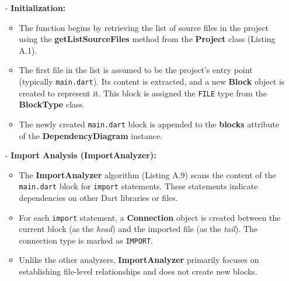 \begin{itemize}
    \item[-] \textbf{Initialization:}
    \begin{itemize}
        \item The function begins by retrieving the list of source files in the project using the \textbf{getListSourceFiles} method from the \textbf{Project} class (Listing A.1).
        \item The first file in the list is assumed to be the project's entry point (typically \texttt{main.dart}). Its content is extracted, and a new \textbf{Block} object is created to represent it. This block is assigned the \texttt{FILE} type from the \textbf{BlockType} class.
        \item The newly created \texttt{main.dart} block is appended to the \textbf{blocks} attribute of the \textbf{DependencyDiagram} instance.
    \end{itemize}

    \item[-] \textbf{Import Analysis (ImportAnalyzer):}
    \begin{itemize}
        \item The \textbf{ImportAnalyzer} algorithm (Listing A.9) scans the content of the \texttt{main.dart} block for \texttt{import} statements. These statements indicate dependencies on other Dart libraries or files.
        \item For each \texttt{import} statement, a \textbf{Connection} object is created between the current block (as the \textit{head}) and the imported file (as the \textit{tail}). The connection type is marked as \texttt{IMPORT}.
        \item Unlike the other analyzers, \textbf{ImportAnalyzer} primarily focuses on establishing file-level relationships and does not create new blocks.
    \end{itemize}


\end{itemize}
